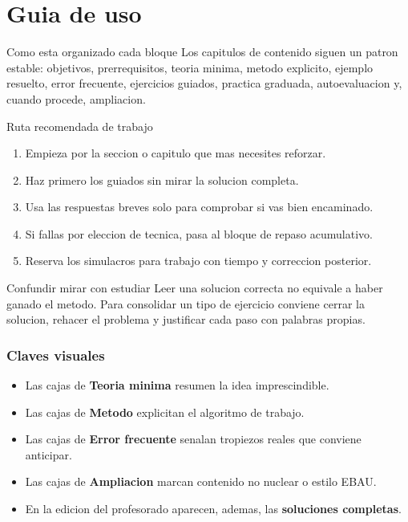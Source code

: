 \chapter*{Guia de uso}

\begin{theorybox}{Como esta organizado cada bloque}
Los capitulos de contenido siguen un patron estable: objetivos, prerrequisitos, teoria minima,
metodo explicito, ejemplo resuelto, error frecuente, ejercicios guiados, practica graduada,
autoevaluacion y, cuando procede, ampliacion.
\end{theorybox}

\begin{methodbox}{Ruta recomendada de trabajo}
\begin{enumerate}
  \item Empieza por la seccion o capitulo que mas necesites reforzar.
  \item Haz primero los guiados sin mirar la solucion completa.
  \item Usa las respuestas breves solo para comprobar si vas bien encaminado.
  \item Si fallas por eleccion de tecnica, pasa al bloque de repaso acumulativo.
  \item Reserva los simulacros para trabajo con tiempo y correccion posterior.
\end{enumerate}
\end{methodbox}

\begin{commonerror}{Confundir mirar con estudiar}
Leer una solucion correcta no equivale a haber ganado el metodo. Para consolidar un tipo de
ejercicio conviene cerrar la solucion, rehacer el problema y justificar cada paso con palabras
propias.
\end{commonerror}

\subsection*{Claves visuales}
\begin{itemize}
  \item Las cajas de \textbf{Teoria minima} resumen la idea imprescindible.
  \item Las cajas de \textbf{Metodo} explicitan el algoritmo de trabajo.
  \item Las cajas de \textbf{Error frecuente} senalan tropiezos reales que conviene anticipar.
  \item Las cajas de \textbf{Ampliacion} marcan contenido no nuclear o estilo EBAU.
  \item En la edicion del profesorado aparecen, ademas, las \textbf{soluciones completas}.
\end{itemize}

